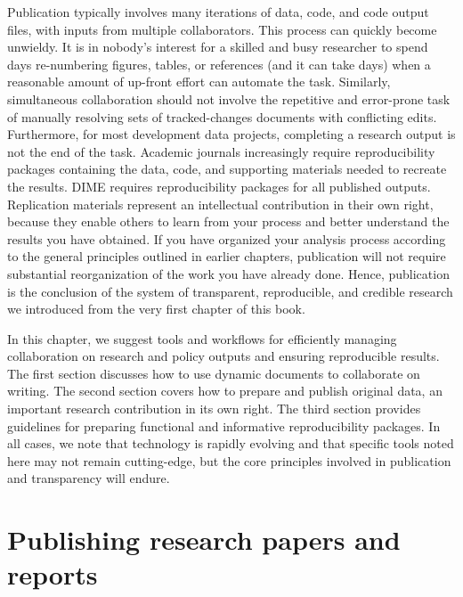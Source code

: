 
\begin{fullwidth}
Publication typically involves many iterations of
data, code, and code output files, with inputs from multiple collaborators.
This process can quickly become unwieldy.
It is in nobody's interest for a skilled and busy researcher
to spend days re-numbering figures, tables, or references (and it can take days)
when a reasonable amount of up-front effort can automate the task.
Similarly, simultaneous collaboration should not involve
the repetitive and error-prone task of manually resolving
sets of tracked-changes documents with conflicting edits.
Furthermore, for most development data projects,
completing a research output is not the end of the task.
Academic journals increasingly require reproducibility packages
containing the data, code, and supporting materials
needed to recreate the results.
DIME requires reproducibility packages for all published outputs.
Replication materials represent an intellectual contribution in their own right,
because they enable others to learn from your process
and better understand the results you have obtained.
If you have organized your analysis process
according to the general principles outlined in earlier chapters,
publication will not require
substantial reorganization of the work you have already done.
Hence, publication is the conclusion of the system
of transparent, reproducible, and credible research we introduced
from the very first chapter of this book.

In this chapter, we suggest tools and workflows for
efficiently managing collaboration on research and policy outputs
and ensuring reproducible results.
The first section discusses how to use dynamic documents to collaborate on writing.
The second section covers how to prepare and publish original data,
an important research contribution in its own right.
The third section provides guidelines for preparing
functional and informative reproducibility packages.
In all cases, we note that technology is rapidly evolving
and that specific tools noted here may not remain cutting-edge,
but the core principles involved in publication and transparency will endure.
\end{fullwidth}


\section{Publishing research papers and reports}

